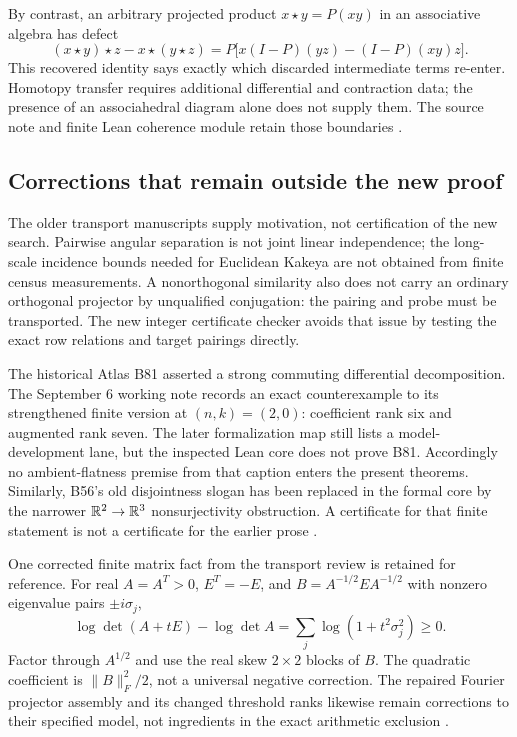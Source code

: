 \documentclass[11pt,letterpaper]{article}
\theoremstyle{definition}
\theoremstyle{remark}\newtheorem{remark}[theorem]{Remark}
\begin{document}
By contrast, an arbitrary projected product $x\star y=P(xy)$ in an associative algebra has defect
\[
(x\star y)\star z-x\star(y\star z)
=P\big[x(I-P)(yz)-(I-P)(xy)z\big].
\]
This recovered identity says exactly which discarded intermediate terms re-enter. Homotopy transfer requires additional differential and contraction data; the presence of an associahedral diagram alone does not supply them. The source note and finite Lean coherence module retain those boundaries \cite{BeasleyNumerators}.

\subsection{Corrections that remain outside the new proof}
The older transport manuscripts supply motivation, not certification of the new search. Pairwise angular separation is not joint linear independence; the long-scale incidence bounds needed for Euclidean Kakeya are not obtained from finite census measurements. A nonorthogonal similarity also does not carry an ordinary orthogonal projector by unqualified conjugation: the pairing and probe must be transported. The new integer certificate checker avoids that issue by testing the exact row relations and target pairings directly.

The historical Atlas B81 asserted a strong commuting differential decomposition. The September 6 working note records an exact counterexample to its strengthened finite version at $(n,k)=(2,0)$: coefficient rank six and augmented rank seven. The later formalization map still lists a model-development lane, but the inspected Lean core does not prove B81. Accordingly no ambient-flatness premise from that caption enters the present theorems. Similarly, B56's old disjointness slogan has been replaced in the formal core by the narrower $\mathbb R^2\to\mathbb R^3$ nonsurjectivity obstruction. A certificate for that finite statement is not a certificate for the earlier prose \cite{BeasleyMethod,BeasleyAtlasKernel}.

One corrected finite matrix fact from the transport review is retained for reference. For real $A=A^T>0$, $E^T=-E$, and $B=A^{-1/2}EA^{-1/2}$ with nonzero eigenvalue pairs $\pm i\sigma_j$,
\[
\log\det(A+tE)-\log\det A=\sum_j\log(1+t^2\sigma_j^2)\geq0.
\]
Factor through $A^{1/2}$ and use the real skew $2\times2$ blocks of $B$. The quadratic coefficient is $\|B\|_F^2/2$, not a universal negative correction. The repaired Fourier projector assembly and its changed threshold ranks likewise remain corrections to their specified model, not ingredients in the exact arithmetic exclusion \cite{BeasleyReview}.
\end{document}
